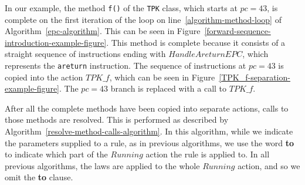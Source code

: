 In our example, the method \texttt{f()} of the \texttt{TPK} class,
which starts at $pc = 43$, is complete on the first iteration of the
loop on line~\ref{algorithm-method-loop} of
Algorithm~\ref{epc-algorithm}.
This can be seen in
Figure~\ref{forward-sequence-introduction-example-figure}.
This method is complete because it consists of a straight sequence of
instructions ending with $HandleAreturnEPC$, which represents the
\texttt{areturn} instruction.
The sequence of instructions at $pc = 43$ is copied into the action
$TPK\_f$, which can be seen in
Figure~\ref{TPK_f-separation-example-figure}.
The $pc = 43$ branch is replaced with a call to $TPK\_f$.

After all the complete methods have been copied into separate actions,
calls to those methods are resolved.
This is performed as described by
Algorithm~\ref{resolve-method-calls-algorithm}.
In this algorithm, while we indicate the parameters supplied to a
rule, as in previous algorithms, we use the word \textbf{to}
to indicate which part of the $Running$ action the rule is applied to.
In all previous algorithms, the laws are applied to the whole
$Running$ action, and so we omit the \textbf{to} clause.
